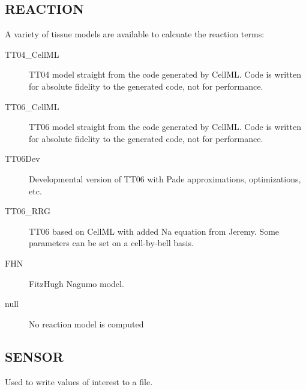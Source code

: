 \documentclass{article}
\begin{document}
\subsection{REACTION}
A variety of tissue models are available to calcuate the reaction terms:

\begin{description}
  \item[TT04\_CellML] TT04 model straight from the code generated by
    CellML.  Code is written for absolute fidelity to the generated
    code, not for performance.
  \item[TT06\_CellML] TT06 model straight from the code generated by
    CellML.  Code is written for absolute fidelity to the generated
    code, not for performance.
  \item[TT06Dev] Developmental version of TT06 with Pade approximations,
    optimizations, etc.
  \item[TT06\_RRG] TT06 based on CellML with added Na equation from
    Jeremy.  Some parameters can be set on a cell-by-bell basis.
  \item[FHN] FitzHugh Nagumo model.
  \item[null] No reaction model is computed
\end{description}



\begin{keywords}
\end{keywords}


\subsection{SENSOR}

Used to write values of interest to a file.


\begin{keywords}
\end{keywords}
\end{document}
